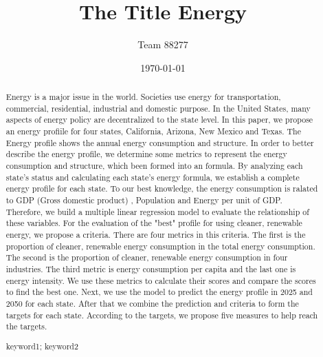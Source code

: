 \documentclass{mcmthesis}
\title{The Title Energy}
\author{Team 88277}
\date{\today}
\begin{document}
\begin{abstract}
  Energy is a major issue in the world. Societies use energy for transportation, commercial, residential, industrial and domestic purpose.
  In the United States, many aspects of energy policy are decentralized to the state level.
  In this paper, we propose an energy profiile for four states, California, Arizona, New Mexico and Texas. The Energy profile shows the annual energy consumption and structure.
  In order to better describe the energy profile, we determine some metrics to represent the energy consumption and structure, which been formed into an formula.
  By analyzing each state's status and calculating each state's energy formula, we establish a complete energy profile for each state. To our best knowledge, the energy consumption is ralated to
  GDP (Gross domestic product) , Population and Energy per unit of GDP. Therefore, we build a multiple linear regression model to evaluate the relationship of these variables.
  For the evaluation of the "best" profile for using cleaner, renewable energy, we propose a criteria. There are four metrics in this criteria. The first is the proportion of cleaner, renewable energy consumption in the total energy consumption.
  The second is the proportion of cleaner, renewable energy consumption in four industries. The third metric is energy consumption per capita and the last one is energy intensity.
  We use these metrics to calculate their scores and compare the scores to find the best one.
  Next, we use the model to predict the energy profile in 2025 and 2050 for each state. After that we combine the prediction and criteria to form the targets for each state.
  According to the targets, we propose five measures to help reach the targets.
\begin{keywords}
keyword1; keyword2
\end{keywords}

\end{abstract}

\maketitle                  %
\tableofcontents
\end{document}
